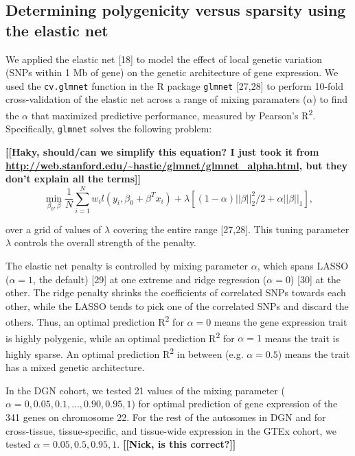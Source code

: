 \documentclass[]{article}
\begin{document}
\subsection{Determining polygenicity versus sparsity using the elastic
net}\label{determining-polygenicity-versus-sparsity-using-the-elastic-net}

We applied the elastic net {[}18{]} to model the effect of local genetic
variation (SNPs within 1 Mb of gene) on the genetic architecture of gene
expression. We used the \texttt{cv.glmnet} function in the R package
\texttt{glmnet} {[}27,28{]} to perform 10-fold cross-validation of the
elastic net across a range of mixing paramaters (\(\alpha\)) to find the
\(\alpha\) that maximized predictive performance, measured by Pearson's
R\textsuperscript{2}. Specifically, \texttt{glmnet} solves the following
problem:

\textbf{{[}{[}Haky, should/can we simplify this equation? I just took it
from \url{http://web.stanford.edu/~hastie/glmnet/glmnet_alpha.html}, but
they don't explain all the terms{]}{]}}
{\[\min_{\beta_0,\beta} \frac{1}{N} \sum_{i=1}^{N} w_i l(y_i,\beta_0+\beta^T x_i) + \lambda\left[(1-\alpha)||\beta||_2^2/2 + \alpha ||\beta||_1\right], \]}

over a grid of values of \(\lambda\) covering the entire range
{[}27,28{]}. This tuning parameter \(\lambda\) controls the overall
strength of the penalty.

The elastic net penalty is controlled by mixing parameter \(\alpha\),
which spans LASSO (\(\alpha=1\), the default) {[}29{]} at one extreme
and ridge regression (\(\alpha=0\)) {[}30{]} at the other. The ridge
penalty shrinks the coefficients of correlated SNPs towards each other,
while the LASSO tends to pick one of the correlated SNPs and discard the
others. Thus, an optimal prediction R\textsuperscript{2} for
\(\alpha=0\) means the gene expression trait is highly polygenic, while
an optimal prediction R\textsuperscript{2} for \(\alpha=1\) means the
trait is highly sparse. An optimal prediction R\textsuperscript{2} in
between (e.g. \(\alpha=0.5\)) means the trait has a mixed genetic
architecture.

In the DGN cohort, we tested 21 values of the mixing parameter
(\(\alpha=0, 0.05, 0.1, ..., 0.90, 0.95, 1\)) for optimal prediction of
gene expression of the 341 genes on chromosome 22. For the rest of the
autosomes in DGN and for cross-tissue, tissue-specific, and tissue-wide
expression in the GTEx cohort, we tested \(\alpha=0.05, 0.5, 0.95, 1\).
\textbf{{[}{[}Nick, is this correct?{]}{]}}
\end{document}

